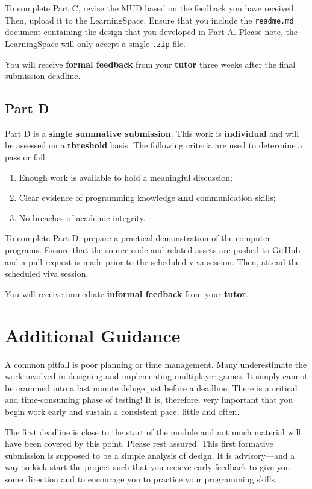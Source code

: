 \documentclass{../../fal_assignment}
\begin{document}
To complete Part C, revise the MUD based on the feedback you have received. Then, upload it to the LearningSpace. Ensure that you include the \texttt{readme.md} document containing the design that you developed in Part A. Please note, the LearningSpace will only accept a single \texttt{.zip} file.

You will receive \textbf{formal feedback} from your \textbf{tutor} three weeks after the final submission deadline.

\subsection*{Part D}

Part D is a \textbf{single summative submission}. This work is \textbf{individual} and will be assessed on a \textbf{threshold} basis.  The following criteria are used to determine a pass or fail:

\begin{enumerate}[label=(\alph*)]
	\item Enough work is available to hold a meaningful discussion;
	\item Clear evidence of programming knowledge \textbf{and} communication skills;
	\item No breaches of academic integrity.
\end{enumerate}

To complete Part D, prepare a practical demonstration of the computer programs. Ensure that the source code and related assets are pushed to GitHub and a pull request is made prior to the scheduled viva session. Then, attend the scheduled viva session.

You will receive immediate \textbf{informal feedback} from your \textbf{tutor}.

\section*{Additional Guidance}

A common pitfall is poor planning or time management. Many underestimate the work involved in designing and implementing multiplayer games. It simply cannot be crammed into a last minute deluge just before a deadline. There is a critical and time-consuming phase of testing! It is, therefore, very important that you begin work early and sustain a consistent pace: little and often.

The first deadline is  close to the start of the module and not much material will have been covered by this point. Please rest assured. This first formative submission is supposed to be a simple analysis of design. It is advisory---and a way to kick start the project such that you recieve early feedback to give you some direction and to encourage you to practice your programming skills.
\end{document}
